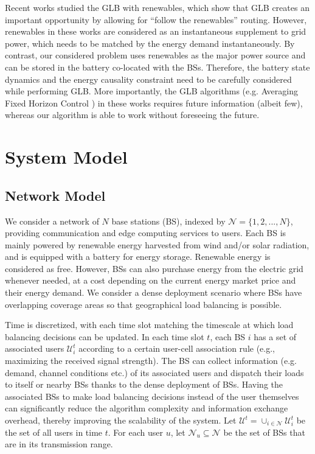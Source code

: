 \documentclass[12pt, draftclsnofoot, letterpaper, onecolumn]{IEEEtran}
\begin{document}
Recent works \cite{lin2012online,liu2015greening} studied the GLB with renewables, which show that GLB creates an important opportunity by allowing for ``follow the renewables'' routing. However, renewables in these works are considered as an instantaneous supplement to grid power, which needs to be matched by the energy demand instantaneously. By contrast, our considered problem uses renewables as the major power source and can be stored in the battery co-located with the BSs. Therefore, the battery state dynamics and the energy causality constraint need to be carefully considered while performing GLB. More importantly, the GLB algorithms (e.g. Averaging Fixed Horizon Control \cite{lin2012online}) in these works requires future information (albeit few), whereas our algorithm is able to work without foreseeing the future.



\section{System Model}
\subsection{Network Model}
We consider a network of $N$ base stations (BS), indexed by $\mathcal{N} = \{1,2,...,N\}$, providing communication and edge computing services to users. Each BS is mainly powered by renewable energy harvested from wind and/or solar radiation, and is equipped with a battery for energy storage. Renewable energy is considered as free. However, BSs can also purchase energy from the electric grid whenever needed, at a cost depending on the current energy market price and their energy demand. We consider a dense deployment scenario where BSs have overlapping coverage areas so that geographical load balancing is possible.

Time is discretized, with each time slot matching the timescale at which load balancing decisions can be updated. In each time slot $t$, each BS $i$ has a set of associated users $\mathcal{U}_i^t$ according to a certain user-cell association rule (e.g., maximizing the received signal strength). The BS can collect information (e.g. demand, channel conditions etc.) of its associated users and dispatch their loads to itself or nearby BSs thanks to the dense deployment of BSs. Having the associated BSs to make load balancing decisions instead of the user themselves can significantly reduce the algorithm complexity and information exchange overhead, thereby improving the scalability of the system. Let $\mathcal{U}^t = \cup_{i\in\mathcal{N}} \mathcal{U}_{i}^t$ be the set of all users in time $t$. For each user $u$, let $\mathcal{N}_u \subseteq \mathcal{N}$ be the set of BSs that are in its transmission range.
\end{document}

